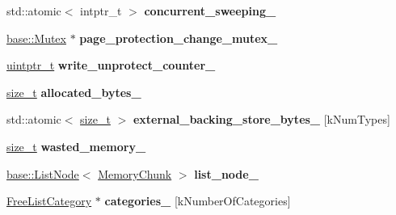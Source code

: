 \begin{DoxyCompactItemize}
\item 
\mbox{\label{classv8_1_1internal_1_1MemoryChunk_a3daeb06cc6d6c34742bee9e0ae1ee2de}} 
std\+::atomic$<$ intptr\+\_\+t $>$ {\bfseries concurrent\+\_\+sweeping\+\_\+}
\item 
\mbox{\label{classv8_1_1internal_1_1MemoryChunk_a6cbe5be93330d114d1f9dbbde7f5bb94}} 
\mbox{\hyperlink{classv8_1_1base_1_1Mutex}{base\+::\+Mutex}} $\ast$ {\bfseries page\+\_\+protection\+\_\+change\+\_\+mutex\+\_\+}
\item 
\mbox{\label{classv8_1_1internal_1_1MemoryChunk_a916432d4f0556d757d5959856b8fca87}} 
\mbox{\hyperlink{classuintptr__t}{uintptr\+\_\+t}} {\bfseries write\+\_\+unprotect\+\_\+counter\+\_\+}
\item 
\mbox{\label{classv8_1_1internal_1_1MemoryChunk_aa8fb8cf2b7d2e1ab830553c051615894}} 
\mbox{\hyperlink{classsize__t}{size\+\_\+t}} {\bfseries allocated\+\_\+bytes\+\_\+}
\item 
\mbox{\label{classv8_1_1internal_1_1MemoryChunk_a2562b304657a8832258cb27bd9d1e31b}} 
std\+::atomic$<$ \mbox{\hyperlink{classsize__t}{size\+\_\+t}} $>$ {\bfseries external\+\_\+backing\+\_\+store\+\_\+bytes\+\_\+} \mbox{[}k\+Num\+Types\mbox{]}
\item 
\mbox{\label{classv8_1_1internal_1_1MemoryChunk_a7413f690dfb64d68eb3d50aab6e22e59}} 
\mbox{\hyperlink{classsize__t}{size\+\_\+t}} {\bfseries wasted\+\_\+memory\+\_\+}
\item 
\mbox{\label{classv8_1_1internal_1_1MemoryChunk_a869b5b75ac4f12ef37b92d8f2d3feee7}} 
\mbox{\hyperlink{classv8_1_1base_1_1ListNode}{base\+::\+List\+Node}}$<$ \mbox{\hyperlink{classv8_1_1internal_1_1MemoryChunk}{Memory\+Chunk}} $>$ {\bfseries list\+\_\+node\+\_\+}
\item 
\mbox{\label{classv8_1_1internal_1_1MemoryChunk_aaf7efc03ae04468d087d0a92d77272bc}} 
\mbox{\hyperlink{classv8_1_1internal_1_1FreeListCategory}{Free\+List\+Category}} $\ast$ {\bfseries categories\+\_\+} \mbox{[}k\+Number\+Of\+Categories\mbox{]}

\end{DoxyCompactItemize}
